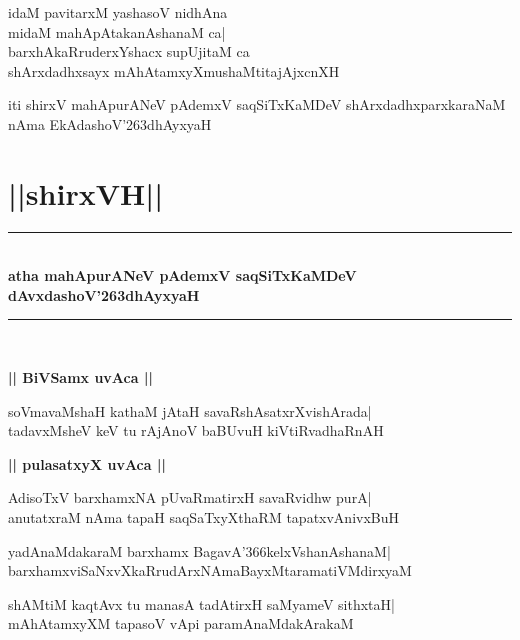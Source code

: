 \documentclass[twoside,12pt,openright]{book}
\def\S{\char'263}
\newcounter{shloka}[chapter]
\def\uvaca#1{\centerline{{\large\textbf{#1}}}}
\begin{document}
\begin{shloka}%
idaM pavitarxM yashasoV nidhAna\\
midaM mahApAtakanAshanaM ca|\\
barxhAkaRruderxYshacx supUjitaM ca\\
shArxdadhxsayx mAhAtamxyXmushaMtitajAjxcnXH
\end{shloka}

\begin{center}
 iti shirxV mahApurANeV pAdemxV saqSiTxKaMDeV shArxdadhxparxkaraNaM\\
 nAma EkAdashoV\S dhAyxyaH
\end{center}

\chapter{||shirxVH||}
\begin{center}
\rule{2cm}{1pt}\\[0.5cm]
{\LARGE\bfseries atha mahApurANeV pAdemxV saqSiTxKaMDeV}\\[.3cm]
{\LARGE\bfseries dAvxdashoV\S dhAyxyaH}\\[.3cm]
\rule{2cm}{1pt}\\
\end{center}

\uvaca{|| BiVSamx uvAca ||}
\begin{shloka}%
soVmavaMshaH kathaM jAtaH savaRshAsatxrXvishArada|\\
tadavxMsheV keV tu rAjAnoV baBUvuH kiVtiRvadhaRnAH
\end{shloka}

\uvaca{|| pulasatxyX uvAca ||}
\begin{shloka}%
AdisoTxV barxhamxNA pUvaRmatirxH savaRvidhw purA|\\
anutatxraM nAma tapaH saqSaTxyXthaRM tapatxvAnivxBuH
\end{shloka}

\begin{shloka}%
yadAnaMdakaraM barxhamx BagavA\char'366kelxVshanAshanaM|\\
barxhamxviSaNxvXkaRrudArxNAmaBayxMtaramatiVMdirxyaM
\end{shloka}

\begin{shloka}%
shAMtiM kaqtAvx tu manasA tadAtirxH saMyameV sithxtaH|\\
mAhAtamxyXM tapasoV vApi paramAnaMdakArakaM
\end{shloka}
\end{document}
